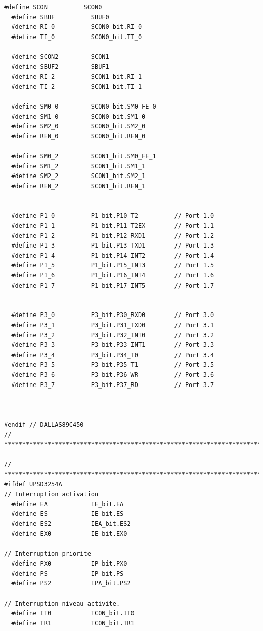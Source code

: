 \documentclass[10pt,a4paper,final]{article}
\begin{document}
\begin{lstlisting}[label={list:first},caption=Code source]
  #define SCON          SCON0
  #define SBUF          SBUF0
  #define RI_0          SCON0_bit.RI_0
  #define TI_0          SCON0_bit.TI_0

  #define SCON2         SCON1
  #define SBUF2         SBUF1
  #define RI_2          SCON1_bit.RI_1
  #define TI_2          SCON1_bit.TI_1

  #define SM0_0         SCON0_bit.SM0_FE_0
  #define SM1_0         SCON0_bit.SM1_0
  #define SM2_0         SCON0_bit.SM2_0
  #define REN_0         SCON0_bit.REN_0

  #define SM0_2         SCON1_bit.SM0_FE_1
  #define SM1_2         SCON1_bit.SM1_1
  #define SM2_2         SCON1_bit.SM2_1
  #define REN_2         SCON1_bit.REN_1


  #define P1_0          P1_bit.P10_T2          // Port 1.0
  #define P1_1          P1_bit.P11_T2EX        // Port 1.1
  #define P1_2          P1_bit.P12_RXD1        // Port 1.2
  #define P1_3          P1_bit.P13_TXD1        // Port 1.3
  #define P1_4          P1_bit.P14_INT2        // Port 1.4
  #define P1_5          P1_bit.P15_INT3        // Port 1.5
  #define P1_6          P1_bit.P16_INT4        // Port 1.6
  #define P1_7          P1_bit.P17_INT5        // Port 1.7


  #define P3_0          P3_bit.P30_RXD0        // Port 3.0
  #define P3_1          P3_bit.P31_TXD0        // Port 3.1
  #define P3_2          P3_bit.P32_INT0        // Port 3.2
  #define P3_3          P3_bit.P33_INT1        // Port 3.3
  #define P3_4          P3_bit.P34_T0          // Port 3.4
  #define P3_5          P3_bit.P35_T1          // Port 3.5
  #define P3_6          P3_bit.P36_WR          // Port 3.6
  #define P3_7          P3_bit.P37_RD          // Port 3.7



#endif // DALLAS89C450
// *****************************************************************************

// *****************************************************************************
#ifdef UPSD3254A
// Interruption activation
  #define EA            IE_bit.EA
  #define ES            IE_bit.ES
  #define ES2           IEA_bit.ES2
  #define EX0           IE_bit.EX0

// Interruption priorite
  #define PX0           IP_bit.PX0
  #define PS            IP_bit.PS
  #define PS2           IPA_bit.PS2

// Interruption niveau activite.
  #define IT0           TCON_bit.IT0
  #define TR1           TCON_bit.TR1


\end{lstlisting}
\end{document}
